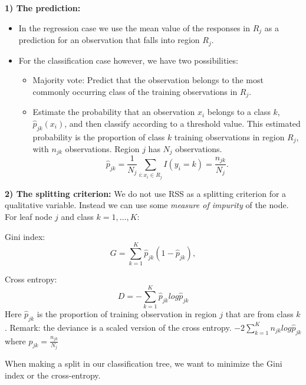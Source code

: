 \documentclass[10pt,ignorenonframetext,]{beamer}
\providecommand{\tightlist}{%
  \setlength{\itemsep}{0pt}\setlength{\parskip}{0pt}}
\begin{document}
\begin{frame}

\textbf{1) The prediction:}

\begin{itemize}
\tightlist
\item
  In the regression case we use the mean value of the responses in
  \(R_j\) as a prediction for an observation that falls into region
  \(R_j\).
\item
  For the classification case however, we have two possibilities:

  \begin{itemize}
  \tightlist
  \item
    Majority vote: Predict that the observation belongs to the most
    commonly occurring class of the training observations in \(R_j\).\\
  \item
    Estimate the probability that an observation \(x_i\) belongs to a
    class \(k\), \(\hat{p}_{jk}(x_i)\), and then classify according to a
    threshold value. This estimated probability is the proportion of
    class \(k\) training observations in region \(R_j\), with \(n_{jk}\)
    observations. Region \(j\) has \(N_j\) observations.
    \[\hat{p}_{jk} = \frac{1}{N_j} \sum_{i:x_i \in R_j} I(y_i = k)=\frac{n_{jk}}{N_j}.\]
  \end{itemize}
\end{itemize}

\end{frame}

\begin{frame}

\textbf{2) The splitting criterion:} We do not use RSS as a splitting
criterion for a qualitative variable. Instead we can use some
\emph{measure of impurity} of the node. For leaf node \(j\) and class
\(k=1,\ldots, K\):

Gini index: \[
G=\sum_{k=1}^K \hat{p}_{jk}(1-\hat{p}_{jk}),
\]

Cross entropy: \[
D=-\sum_{k=1}^K \hat{p}_{jk}log\hat{p}_{jk}
\] Here \(\hat{p}_{jk}\) is the proportion of training observation in
region \(j\) that are from class \(k\). Remark: the deviance is a scaled
version of the cross entropy. \(-2\sum_{k=1}^K n_{jk} log\hat{p}_{jk}\)
where \(\hat{p}_{jk}=\frac{n_{jk}}{N_j}\)

When making a split in our classification tree, we want to minimize the
Gini index or the cross-entropy.

\end{frame}
\end{document}
